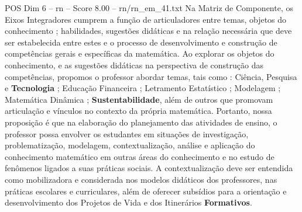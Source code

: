 \begin{textsample}{POS Dim 6 – rn – Score 8.00 – rn/rn\_em\_41.txt}
Na Matriz de Componente, os Eixos Integradores cumprem a função de articuladores entre temas, objetos do conhecimento ; habilidades, sugestões didáticas e na relação necessária que deve ser estabelecida entre estes e o processo de desenvolvimento e construção de competências gerais e específicas da matemática.
Ao explorar os objetos do conhecimento, e as sugestões didáticas na perspectiva de construção das competências, propomos o professor abordar temas, tais como : Ciência, Pesquisa e \textbf{Tecnologia} ; Educação Financeira ; Letramento Estatístico ; Modelagem ; Matemática Dinâmica ; \textbf{Sustentabilidade}, além de outros que promovam articulação e vínculos no contexto da própria matemática.
Portanto, nossa proposição é que na elaboração do planejamento das atividades de ensino, o professor possa envolver os estudantes em situações de investigação, problematização, modelagem, contextualização, análise e aplicação do conhecimento matemático em outras áreas do conhecimento e no estudo de fenômenos ligados a suas práticas sociais.
A contextualização deve ser entendida como mobilizadora e considerada nos modelos didáticos dos professores, nas práticas escolares e curriculares, além de oferecer subsídios para a orientação e desenvolvimento dos Projetos de Vida e dos Itinerários \textbf{Formativos}.

\end{textsample}
